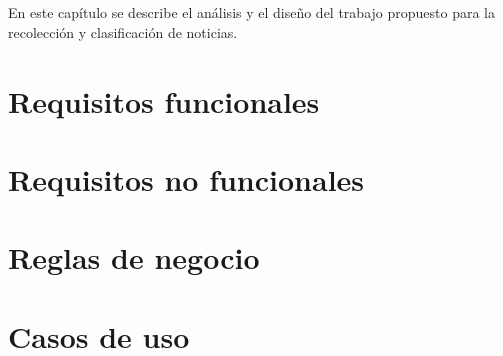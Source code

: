 \ \\\\
En este capítulo se describe el análisis y el diseño del trabajo propuesto para
la recolección y clasificación de noticias.

\section[Requisitos f.]{Requisitos funcionales}


\section[Requisitos no f.]{Requisitos no funcionales}


\section{Reglas de negocio}



\newpage
\section{Casos de uso}



{\setlength{\parindent}{0pt}%
  
  \newpage
  
  \newpage
  
  \newpage
  
  \newpage
  
  \newpage
  

}

